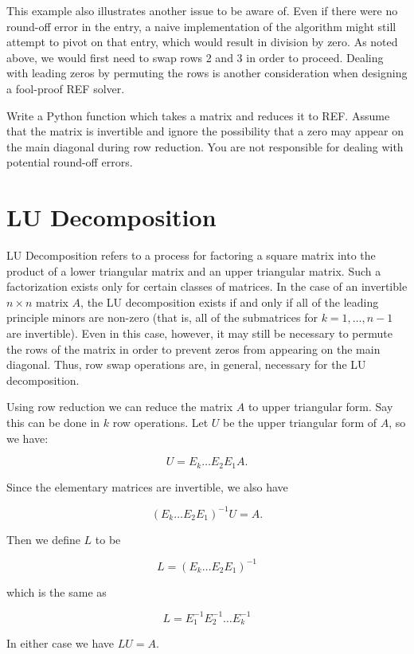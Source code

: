 This example also illustrates another issue to be aware of. Even if there were no round-off error in the  entry, a naive implementation of the algorithm might still attempt to pivot on that entry, which would result in division by zero. As noted above, we would first need to swap rows 2 and 3 in order to proceed. Dealing with leading zeros by permuting the rows is another consideration when designing a fool-proof REF solver.

\begin{problem}
\label{prob:REF}
Write a Python function which takes a matrix and reduces it to REF.
Assume that the matrix is invertible and ignore the possibility that a zero may appear on the main diagonal during row reduction. You are not
responsible for dealing with potential round-off errors.
\end{problem}

\section*{LU Decomposition}
LU Decomposition refers to a process for factoring a square matrix into the product of a lower triangular matrix and an upper triangular matrix. Such a factorization exists only for certain classes of matrices. In the case of an invertible $n \times n$ matrix $A$, the LU decomposition exists if and only if all of the leading principle minors are non-zero (that is, all of the submatrices  for $k = 1,\ldots,n-1$ are invertible). Even in this case, however, it may still be necessary to permute the rows of the matrix in order to prevent zeros from appearing on the main diagonal. Thus, row swap operations are, in general, necessary for the LU decomposition.

Using row reduction we can reduce the matrix $A$ to upper triangular form. Say this can be done in $k$ row operations.
Let $U$ be the upper triangular form of $A$, so we have:

\[
U = E_k \dots E_2 E_1 A.
\]

Since the elementary matrices are invertible, we also have

\[
(E_k \dots E_2 E_1)^{-1} U =  A.
\]

Then we define $L$ to be

\[
L = (E_k \dots E_2 E_1)^{-1}
\]

which is the same as

\[
L = E_1^{-1} E_2^{-1} \dots E_k^{-1}
\]

In either case we have $L U = A$.

